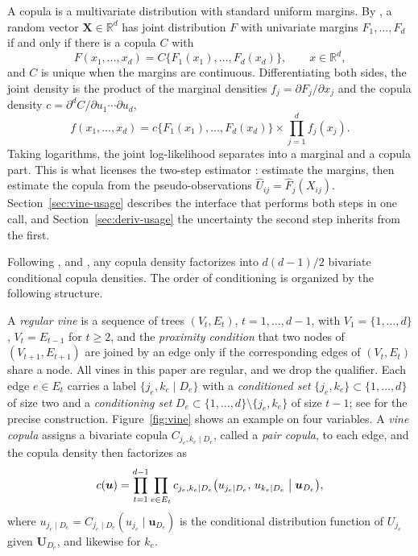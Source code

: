 \documentclass[article]{jss}
\newcommand{\Reals}{\mathbb{R}}
\newcommand{\bX}{\bm{X}}
\newcommand{\bU}{\bm{U}}
\newcommand{\bu}{\bm{u}}
\begin{document}
A copula is a multivariate distribution with standard uniform margins.  By
\citet{sklar1959}, a random vector $\bX \in \Reals^d$ has joint distribution $F$
with univariate margins $F_1, \dots, F_d$ if and only if there is a copula $C$
with
\begin{equation}\label{eq:sklar}
  F(x_1, \dots, x_d) = C\{F_1(x_1), \dots, F_d(x_d)\},
  \qquad x \in \Reals^d,
\end{equation}
and $C$ is unique when the margins are continuous.  Differentiating both sides,
the joint density is the product of the marginal densities
$f_j = \partial F_j / \partial x_j$ and the copula density
$c = \partial^d C / \partial u_1 \cdots \partial u_d$,
\begin{equation}\label{eq:sklar-dens}
  f(x_1, \dots, x_d) = c\{F_1(x_1), \dots, F_d(x_d)\}
    \times \textstyle\prod_{j=1}^d f_j(x_j).
\end{equation}
Taking logarithms, the joint log-likelihood separates into a marginal and a
copula part.  This is what licenses the two-step estimator
\citep{genest1995, joe1996ifm, joe2005}: estimate the margins, then estimate the
copula from the pseudo-observations $\widehat{U}_{ij} = \widehat{F}_j(X_{ij})$.
Section~\ref{sec:vine-usage} describes the interface that performs both steps in
one call, and Section~\ref{sec:deriv-usage} the uncertainty the second step
inherits from the first.

Following \citet{joe1996}, \citet{bedford2001} and \citet{bedford2002}, any
copula density factorizes into $d(d-1)/2$ bivariate conditional copula
densities.  The order of conditioning is organized by the following structure.

A \emph{regular vine} is a sequence of trees $(V_t, E_t)$,
$t = 1, \dots, d-1$, with $V_1 = \{1, \dots, d\}$, $V_t = E_{t-1}$ for
$t \geq 2$, and the \emph{proximity condition} that two nodes of
$(V_{t+1}, E_{t+1})$ are joined by an edge only if the corresponding edges of
$(V_t, E_t)$ share a node.  All vines in this paper are regular, and we drop
the qualifier.  Each edge $e \in E_t$
carries a label $\{j_e, k_e \mid D_e\}$ with a \emph{conditioned set}
$\{j_e, k_e\} \subset \{1, \dots, d\}$ of size two and a \emph{conditioning
set} $D_e \subset \{1, \dots, d\} \setminus \{j_e, k_e\}$ of size $t-1$; see
\citet{czado2022} for the precise construction.  Figure~\ref{fig:vine} shows an
example on four variables.  A \emph{vine copula} assigns a bivariate copula
$C_{j_e, k_e \mid D_e}$, called a \emph{pair copula}, to each edge, and the
copula density then factorizes as
\begin{equation}\label{eq:vine}
  c(\bu) = \prod_{t=1}^{d-1} \prod_{e \in E_t}
    c_{j_e, k_e \mid D_e}\bigl(u_{j_e \mid D_e},\, u_{k_e \mid D_e}
      \bigm\vert \bu_{D_e}\bigr),
\end{equation}
where $u_{j_e \mid D_e} = C_{j_e \mid D_e}(u_{j_e} \mid \bu_{D_e})$ is the
conditional distribution function of $U_{j_e}$ given $\bU_{D_e}$, and likewise
for $k_e$.
\end{document}
